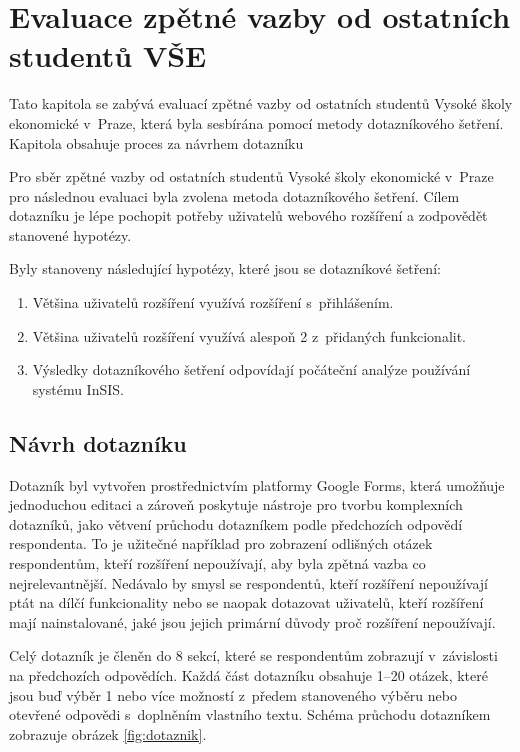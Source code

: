 \chapter{Evaluace zpětné vazby od ostatních studentů VŠE}\label{chap:zpetna-vazba}

Tato kapitola se zabývá evaluací zpětné vazby od ostatních studentů Vysoké školy ekonomické v~Praze, která byla sesbírána pomocí metody dotazníkového šetření. Kapitola obsahuje proces za návrhem dotazníku

Pro sběr zpětné vazby od ostatních studentů Vysoké školy ekonomické v~Praze pro následnou evaluaci byla zvolena metoda dotazníkového šetření. Cílem dotazníku je lépe pochopit potřeby uživatelů webového rozšíření a zodpovědět stanovené hypotézy.

Byly stanoveny následující hypotézy, které jsou se dotazníkové šetření:

\begin{enumerate}
    \item Většina uživatelů rozšíření využívá rozšíření s~přihlášením.
    \item Většina uživatelů rozšíření využívá alespoň 2 z~přidaných funkcionalit.
    \item Výsledky dotazníkového šetření odpovídají počáteční analýze používání systému InSIS.
\end{enumerate}

\section{Návrh dotazníku}

Dotazník byl vytvořen prostřednictvím platformy Google Forms, která umožňuje jednoduchou editaci a zároveň poskytuje nástroje pro tvorbu komplexních dotazníků, jako větvení průchodu dotazníkem podle předchozích odpovědí respondenta. To je užitečné například pro zobrazení odlišných otázek respondentům, kteří rozšíření nepoužívají, aby byla zpětná vazba co nejrelevantnější. Nedávalo by smysl se respondentů, kteří rozšíření nepoužívají ptát na dílčí funkcionality nebo se naopak dotazovat uživatelů, kteří rozšíření mají nainstalované, jaké jsou jejich primární důvody proč rozšíření nepoužívají. 

Celý dotazník je členěn do 8 sekcí, které se respondentům zobrazují v~závislosti na předchozích odpovědích. Každá část dotazníku obsahuje 1--20 otázek, které jsou buď výběr 1 nebo více možností z~předem stanoveného výběru nebo otevřené odpovědi s~doplněním vlastního textu. Schéma průchodu dotazníkem zobrazuje obrázek \ref{fig:dotaznik}.


